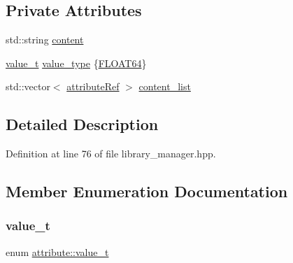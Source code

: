 \subsection*{Private Attributes}
\begin{DoxyCompactItemize}
\item 
std\+::string \hyperlink{structattribute_a45604f9a4f97f3177fac396cf9a25a21}{content}
\item 
\hyperlink{structattribute_a96d7b81ba16957b777d234cf215f004d}{value\+\_\+t} \hyperlink{structattribute_a214bbc386224ecfa7ad117b742d07546}{value\+\_\+type} \{\hyperlink{structattribute_a96d7b81ba16957b777d234cf215f004dadcd22770c2c0f0c58b30667ed8d81d73}{F\+L\+O\+A\+T64}\}
\item 
std\+::vector$<$ \hyperlink{library__manager_8hpp_a46399d2eacc03fb10f84fb33987ab8e3}{attribute\+Ref} $>$ \hyperlink{structattribute_afa8bf3742e4a53fb2dbb76e1153ed15c}{content\+\_\+list}
\end{DoxyCompactItemize}


\subsection{Detailed Description}


Definition at line 76 of file library\+\_\+manager.\+hpp.



\subsection{Member Enumeration Documentation}
\mbox{\label{structattribute_a96d7b81ba16957b777d234cf215f004d}} 
\subsubsection{\texorpdfstring{value\+\_\+t}{value\_t}}
{\footnotesize\ttfamily enum \hyperlink{structattribute_a96d7b81ba16957b777d234cf215f004d}{attribute\+::value\+\_\+t}}

